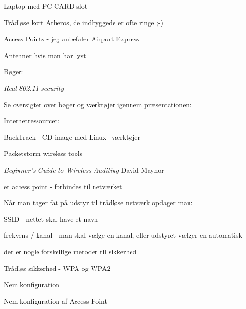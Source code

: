 \documentclass[Screen16to9,17pt]{foils}
\begin{document}

\begin{list1}
\item Laptop med PC-CARD slot
\item Trådløse kort Atheros, de indbyggede er ofte ringe ;-)
\item Access Points - jeg anbefaler Airport Express
\item Antenner hvis man har lyst
\item Bøger:
\begin{list2}
\item \emph{Real 802.11 security}
\item Se oversigter over bøger og værktøjer igennem præsentationen:
\end{list2}
\item Internetressourcer:
\begin{list2}
\item BackTrack - CD image med Linux+værktøjer
\item Packetstorm wireless tools
\item \emph{Beginner's Guide to Wireless Auditing}
David Maynor
\end{list2}
\end{list1}




\centerline{\hlkbig et access point - forbindes til netværket}


\begin{list1}
\item Når man tager fat på udstyr til trådløse netværk opdager man:
\item SSID - nettet skal have et navn
\item frekvens / kanal - man skal vælge en kanal, eller udstyret
  vælger en automatisk
\item der er nogle forskellige metoder til sikkerhed
\end{list1}



\begin{list2}
\item Trådløs sikkerhed - WPA og WPA2
\item Nem konfiguration
\item Nem konfiguration af Access Point
\end{list2}
\end{document}
